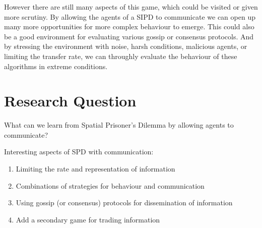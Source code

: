 \documentclass[english]{article}
\begin{document}
However there are still many aspects of this game, which could be visited or given more scrutiny.
By allowing the agents of a SIPD to communicate we can open up many more opportunities for more complex behaviour to emerge.
This could also be a good environment for evaluating various gossip or consensus protocols. 
And by stressing the environment with noise, harsh conditions, malicious agents, or limiting the transfer rate, we can throughly evaluate the behaviour of these algorithms in extreme conditions.



\section*{Research Question}


What can we learn from Spatial Prisoner’s Dilemma by allowing agents to communicate?

Interesting aspects of SPD with communication:
\begin{enumerate}
\item Limiting the rate and representation of information
\item Combinations of strategies for behaviour and communication
\item Using gossip (or consensus) protocols for dissemination of information
\item Add a secondary game for trading information 
\end{enumerate}
\end{document}
